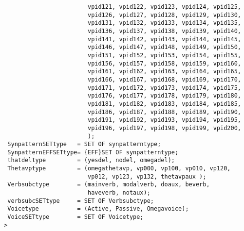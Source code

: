 \begin{verbatim}
                         vpid121, vpid122, vpid123, vpid124, vpid125,
                         vpid126, vpid127, vpid128, vpid129, vpid130,
                         vpid131, vpid132, vpid133, vpid134, vpid135,
                         vpid136, vpid137, vpid138, vpid139, vpid140,
                         vpid141, vpid142, vpid143, vpid144, vpid145,
                         vpid146, vpid147, vpid148, vpid149, vpid150,
                         vpid151, vpid152, vpid153, vpid154, vpid155,
                         vpid156, vpid157, vpid158, vpid159, vpid160,
                         vpid161, vpid162, vpid163, vpid164, vpid165,
                         vpid166, vpid167, vpid168, vpid169, vpid170,
                         vpid171, vpid172, vpid173, vpid174, vpid175,
                         vpid176, vpid177, vpid178, vpid179, vpid180,
                         vpid181, vpid182, vpid183, vpid184, vpid185,
                         vpid186, vpid187, vpid188, vpid189, vpid190,
                         vpid191, vpid192, vpid193, vpid194, vpid195,
                         vpid196, vpid197, vpid198, vpid199, vpid200,
                         );
  SynpatternSETtype   = SET OF synpatterntype;
  SynpatternEFFSETtype= {EFF}SET OF synpatterntype;
  thatdeltype         = (yesdel, nodel, omegadel);           
  Thetavptype         = (omegathetavp, vp000, vp100, vp010, vp120, 
                         vp012, vp123, vp132, thetavpaux );  
  Verbsubctype        = (mainverb, modalverb, doaux, beverb, 
                         haveverb, notaux);        
  verbsubcSETtype     = SET OF Verbsubctype;        
  Voicetype           = (Active, Passive, Omegavoice);
  VoiceSETtype        = SET OF Voicetype;
 >
\end{verbatim}

